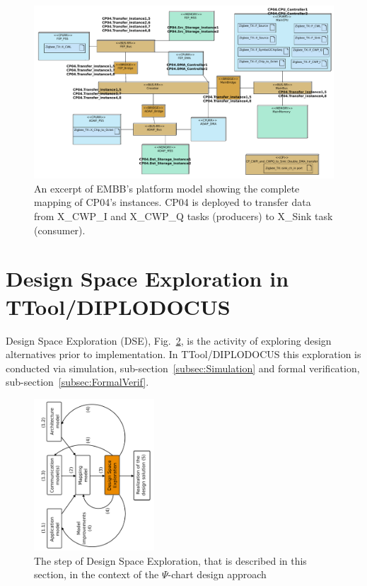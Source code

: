 \documentclass{llncs}
\begin{document}
\begin{figure}[!htbp]
	\centering
	\includegraphics[angle=90,origin=c,height=0.8\paperwidth]{figures/evaluation/MappingCP04.pdf}
    \caption{An excerpt of EMBB's platform model showing the complete mapping of CP04's instances. CP04 is deployed to
        transfer data from X\_CWP\_I and X\_CWP\_Q tasks (producers) to X\_Sink task (consumer).}
	\label{fig:ArchExcerptCP04}
\end{figure}
%
%
%
\newpage
\section{Design Space Exploration in TTool/DIPLODOCUS}
\label{sec:DSE}
%
Design Space Exploration (DSE), Fig.~\ref{fig:PsiChartDes}, is the activity of exploring design alternatives prior to
implementation. In TTool/\-DI\-PLO\-DO\-CUS this exploration is conducted via simulation,
sub-section~\ref{subsec:Simulation} and formal verification, sub-section~\ref{subsec:FormalVerif}.
%
\begin{figure}[htbp]
	\centering
	\includegraphics[angle=-90,origin=c,width=0.4\textwidth]{figures/PsiChartDes.pdf}
	\caption{The step of Design Space Exploration, that is described in this section, in the context of the $\Psi$-chart
    design approach}
	\label{fig:PsiChartDes}
\end{figure}
%
\end{document}
